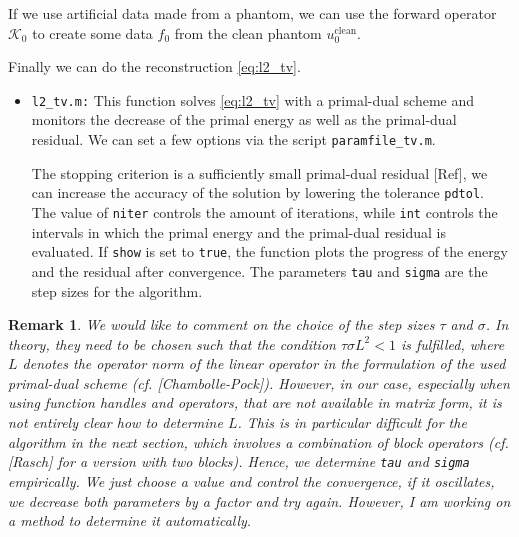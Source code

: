 \documentclass{article}
\newcommand{\mat}[1]{\lstinline[style=Matlab-editor]{#1}}
\newcommand{\Kcal}{\mathcal{K}}
\newtheorem{myrem}{Remark}
\begin{document}
If we use artificial data made from a phantom, we can use the forward operator $\Kcal_0$ to create some data $f_0$ from the clean phantom $u_0^{\mathrm{clean}}$. 
Finally we can do the reconstruction \eqref{eq:l2_tv}. 
\begin{itemize}
 \item \mat{l2_tv.m:} This function solves \eqref{eq:l2_tv} with a primal-dual scheme and monitors the decrease of the primal energy as well as the primal-dual residual. 
 We can set a few options via the script \mat{paramfile_tv.m}. 
 
 The stopping criterion is a sufficiently small primal-dual residual [Ref], we can increase the accuracy of the solution by lowering the tolerance \mat{pdtol}.
 The value of \mat{niter} controls the amount of iterations, while \mat{int} controls the intervals in which the primal energy and the primal-dual residual is evaluated.
 If \mat{show} is set to \mat{true}, the function plots the progress of the energy and the residual after convergence.
 The parameters \mat{tau} and \mat{sigma} are the step sizes for the algorithm.
\end{itemize}

\begin{myrem}
 We would like to comment on the choice of the step sizes $\tau$ and $\sigma$. 
 In theory, they need to be chosen such that the condition $\tau \sigma L^2 < 1$ is fulfilled, where $L$ denotes the operator norm of the linear operator in the formulation of the used primal-dual scheme (cf. [Chambolle-Pock]).
 However, in our case, especially when using function handles and operators, that are not available in matrix form, it is not entirely clear how to determine $L$. 
 This is in particular difficult for the algorithm in the next section, which involves a combination of block operators (cf. [Rasch] for a version with two blocks). 
 Hence, we determine \mat{tau} and \mat{sigma} empirically. 
 We just choose a value and control the convergence, if it oscillates, we decrease both parameters by a factor and try again.
 However, I am working on a method to determine it automatically.
\end{myrem}
\end{document}
